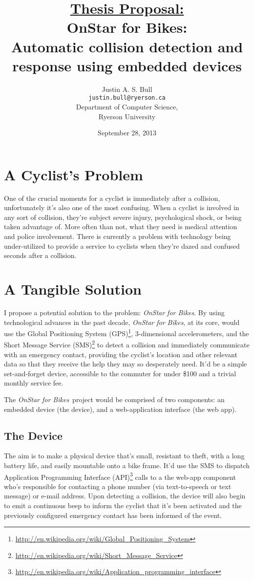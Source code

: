 \documentclass[titlepage]{article}
\title{\underline{Thesis Proposal:}\\
	\vspace{12pt}
	OnStar for Bikes:\\
	Automatic collision detection and response using embedded devices}
\author{Justin A. S. Bull\\
	\texttt{justin.bull@ryerson.ca}\\
	Department of Computer Science,\\
	Ryerson University\\}
\date{September 28, 2013}
\newcommand{\onstar}{{\em OnStar for Bikes}}
\begin{document}
\maketitle

\section{A Cyclist's Problem}
One of the crucial moments for a cyclist is immediately after a collision, unfortunately it's also one of the most confusing. When a cyclist is involved in any sort of collision, they're subject severe injury, psychological shock, or being taken advantage of. More often than not, what they need is medical attention and police involvement. There is currently a problem with technology being under-utilized to provide a service to cyclists when they're dazed and confused seconds after a collision.

\section{A Tangible Solution}
I propose a potential solution to the problem: \onstar. By using technological advances in the past decade, \onstar, at its core, would use the Global Positioning System (GPS)\footnote{\url{http://en.wikipedia.org/wiki/Global_Positioning_System}}, 3-dimensional accelerometers, and the Short Message Service (SMS)\footnote{\url{http://en.wikipedia.org/wiki/Short_Message_Service}} to detect a collision and immediately communicate with an emergency contact, providing the cyclist's location and other relevant data so that they receive the help they may so desperately need. It'd be a simple set-and-forget device, accessible to the commuter for under \$100 and a trivial monthly service fee.

The \onstar\ project would be comprised of two components: an embedded device (the device), and a web-application interface (the web app).

\subsection{The Device}
The aim is to make a physical device that's small, resistant to theft, with a long battery life, and easily mountable onto a bike frame. It'd use the SMS to dispatch Application Programming Interface (API)\footnote{\url{http://en.wikipedia.org/wiki/Application_programming_interface}} calls to a the web-app component who's responsible for contacting a phone number (via text-to-speech or text message) or e-mail address. Upon detecting a collision, the device will also begin to emit a continuous beep to inform the cyclist that it's been activated and the previously configured emergency contact has been informed of the event.
\end{document}
